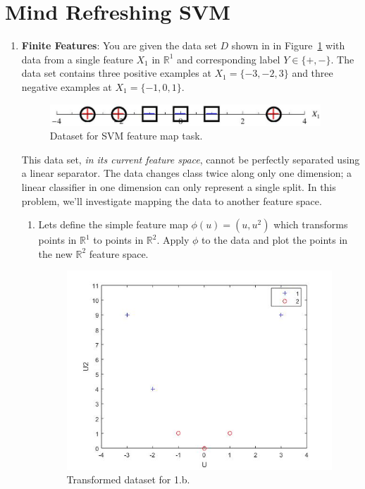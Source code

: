 \section{Mind Refreshing SVM }

\begin{enumerate}
\item \textbf{Finite Features}: You are given the data set $D$ shown
  in in Figure~\ref{fig:svm_dataset} with data from a single feature
  $X_1$ in $\mathbb{R}^1$ and corresponding label $Y\in\{+,-\}$. The
  data set contains three positive examples at $X_1=\{-3,-2,3\}$ and
  three negative examples at $X_1=\{-1,0,1\}$.

  \begin{figure}[H]
    \begin{center}
      \includegraphics[width=4in]{images/svm_dataset.jpeg}
    \end{center}
    \caption{Dataset for SVM feature map task.}
    \label{fig:svm_dataset}
  \end{figure}
  
  This data set, \emph{in its current feature space}, cannot be
  perfectly separated using a linear separator.  The data changes
  class twice along only one dimension; a linear classifier in one
  dimension can only represent a single split.  In this problem, we'll
  investigate mapping the data to another feature space.

  \begin{enumerate}
  \item {} Lets define the simple feature map
    $\phi(u)=(u,u^2)$ which transforms points in $\mathbb{R}^1$ to
    points in $\mathbb{R}^2$.  Apply $\phi$ to the data and plot the
    points in the new $\mathbb{R}^2$ feature space.
	
\begin{figure}[H]
    \begin{center}
      \includegraphics[width=4in]{images/1_1.jpg}
    \end{center}
    \caption{Transformed dataset for 1.b.}
    \label{fig:1.b}
  \end{figure}
  

\end{enumerate}
\end{enumerate}
